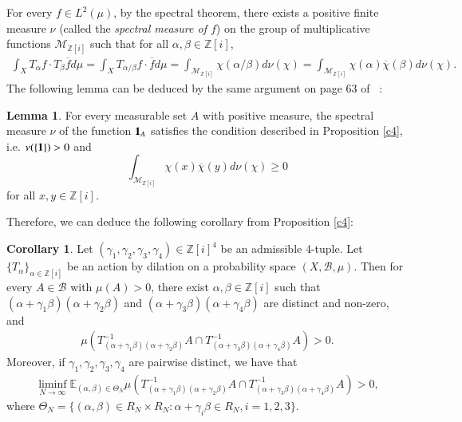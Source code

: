 \documentclass[12pt,amstex]{amsart}
\theoremstyle{definition}
\newtheorem{lem}[thm]{Lemma}
\newtheorem{cor}[thm]{Corollary}
\def \Z {\mathbb{Z}[i]}
\def \A {\alpha}
\def \B {\beta}
\def \C {\gamma}
\begin{document}
For every $f\in L^{2}(\mu)$, by the spectral theorem, there exists a positive finite measure $\nu$ (called the \emph{spectral measure  of $f$}) on the group of
multiplicative functions $\mathcal{M}_{\Z}$ such that for all $\A,\B\in\Z$,
\begin{equation}\nonumber
  \begin{split}
    \int_{X}{T_{\A}f\cdot T_{\B}\overline{f}}d\mu=\int_{X}{T_{\A/\B}f\cdot \overline{f}}d\mu=\int_{\mathcal{M}_{\Z}}{\chi(\A/\B)}d\nu(\chi)
    =\int_{\mathcal{M}_{\Z}}{\chi(\A)\overline{\chi}(\B)}d\nu(\chi).
  \end{split}
  \end{equation}
The following lemma can be deduced by the same argument on page 63 of ~\cite{FH}:
\begin{lem}\label{37}
For every measurable set $A$ with positive measure, the spectral measure $\nu$ of the function $\bold{1}_{A}$ satisfies the condition described in Proposition \ref{c4}, i.e. 
$\nu(\{\bold{1}\})>0$ and $$\int_{\mathcal{M}_{\Z}}\chi(x)\overline{\chi}(y)d\nu(\chi)\geq 0$$ 
for all $x,y\in \Z$.
\end{lem}
 
  Therefore, we can deduce the following corollary from Proposition \ref{c4}:
\begin{cor}\label{c3}
  Let $(\C_{1},\C_{2},\C_{3},\C_{4})\in\Z^{4}$ be an admissible 4-tuple. Let $\{T_{\A}\}_{\A\in\Z}$ be an action by dilation on a probability space $(X,\mathcal{B},\mu)$. Then for every $A\in\mathcal{B}$ with $\mu(A)>0$, there exist $\A,\B\in\Z$ such that $(\A+\C_{1}\B)(\A+\C_{2}\B)$ and $(\A+\C_{3}\B)(\A+\C_{4}\B)$ are distinct and non-zero, and
    \begin{equation}\nonumber
  \begin{split}
    \mu(T_{(\A+\C_{1}\B)(\A+\C_{2}\B)}^{-1}A\cap T_{(\A+\C_{3}\B)(\A+\C_{4}\B)}^{-1}A)>0.
  \end{split}
  \end{equation}
  Moreover, if $\C_{1},\C_{2},\C_{3},\C_{4}$ are pairwise distinct, we have that
  \begin{equation}\nonumber
  \begin{split}
    \liminf_{N\rightarrow\infty}\mathbb{E}_{(\A,\B)\in\Theta_{N}}\mu(T_{(\A+\C_{1}\B)(\A+\C_{2}\B)}^{-1}A\cap T_{(\A+\C_{3}\B)(\A+\C_{4}\B)}^{-1}A)>0,
  \end{split}
  \end{equation}
  where $\Theta_{N}=\{(\A,\B)\in R_{N}\times  R_{N}\colon \A+\C_{i}\B\in R_{N}, i=1,2,3\}$.
\end{cor}
\end{document}
